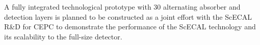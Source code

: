 A fully integrated technological prototype with 30 alternating absorber and detection 
layers is planned to be constructed 
as a joint effort with the ScECAL R\&D for CEPC 
to demonstrate the performance of the ScECAL technology 
and its scalability to the full-size detector. 

\vspace{2cm}
